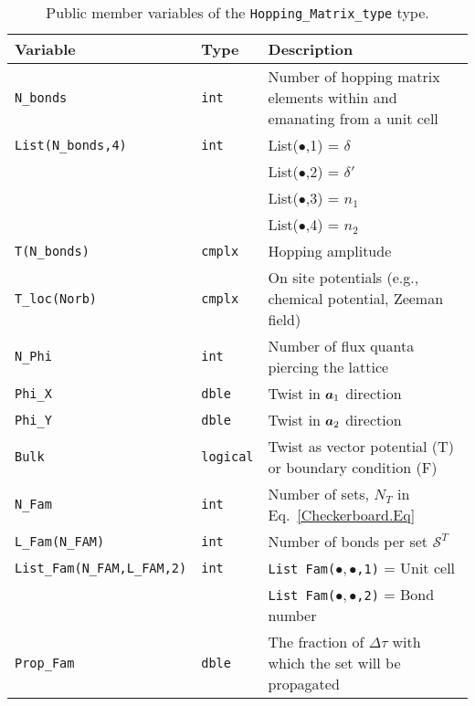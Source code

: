 \begin{table}[h]
	\begin{center}
		\begin{tabular}{@{} p{} @{} p{} p{} @{}}\toprule
			Variable                 & Type            & Description \\\midrule
			\texttt{N\_bonds}        & \texttt{int}    & Number of  hopping  matrix elements within and  emanating from   a unit cell   \\
			\texttt{List(N\_bonds,4)}& \texttt{int}    & List($\bullet$,1) =   $\delta$ \\
			&                 & List($\bullet$,2) =   $\delta'$ \\
			&                 & List($\bullet$,3) =   $n_1$     \\
			&                 & List($\bullet$,4) =   $n_2$     \\ 
			\texttt{T(N\_bonds)}     & \texttt{cmplx}  & Hopping amplitude   \\
			\texttt{T\_loc(Norb)}    & \texttt{cmplx}  & On site  potentials (e.g., chemical potential, Zeeman field)   \\
			\texttt{N\_Phi}          & \texttt{int}    & Number of  flux quanta piercing the lattice   \\
			\texttt{Phi\_X}          & \texttt{dble}   & Twist in $\boldsymbol{a}_1$  direction   \\
			\texttt{Phi\_Y}          & \texttt{dble}   & Twist in $\boldsymbol{a}_2$  direction   \\
			\texttt{Bulk}            & \texttt{logical}& Twist as vector potential (T) or  boundary condition (F)  \\
			\texttt{N\_Fam}          & \texttt{int}    & Number of  sets, $N_T$ in Eq.~\eqref{Checkerboard.Eq}   \\
			\texttt{L\_Fam(N\_FAM)}  & \texttt{int}    & Number of bonds per set $\mathcal{S}^{T}$ \\    
			\texttt{List\_Fam(N\_FAM,L\_FAM,2)}& \texttt{int} & \texttt{List Fam($ \bullet,\bullet $,1)} =  Unit cell \\
			&                        &          \texttt{List Fam($\bullet,\bullet$,2)} =   Bond number \\
			\texttt{Prop\_Fam} & \texttt{dble}         & The fraction of $\Delta \tau$ with which the set will be propagated   \                                
			\\\bottomrule
		\end{tabular}
		\caption{Public member variables of the \texttt{Hopping\_Matrix\_type}  type.
			\label{table:Hopping_matrix}}
	\end{center}
\end{table}

